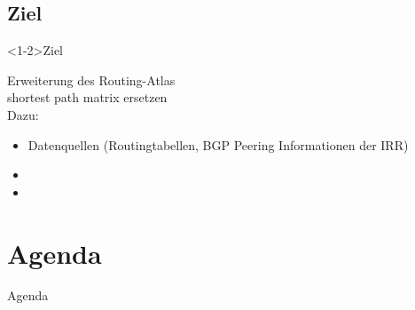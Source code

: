 \documentclass[ngerman,compress,hyperref={bookmarks}]{beamer}
\begin{document}
\subsection{Ziel}
\begin{frame}<1-2>{Ziel}
\begin{center}
{\Large Erweiterung des Routing-Atlas}\\
\vspace{0.5cm}
shortest path matrix ersetzen\\
\vspace{0.5cm}
Dazu:
\begin{itemize}
  \item Datenquellen (Routingtabellen, BGP Peering Informationen der IRR)
  \item {}
  \item {}
\end{itemize}
\end{center}
\end{frame}

\section*{Agenda}
\begin{frame}{Agenda} \setcounter{tocdepth}{1} \tableofcontents[part=1] \setcounter{tocdepth}{3} \end{frame}
\end{document}
